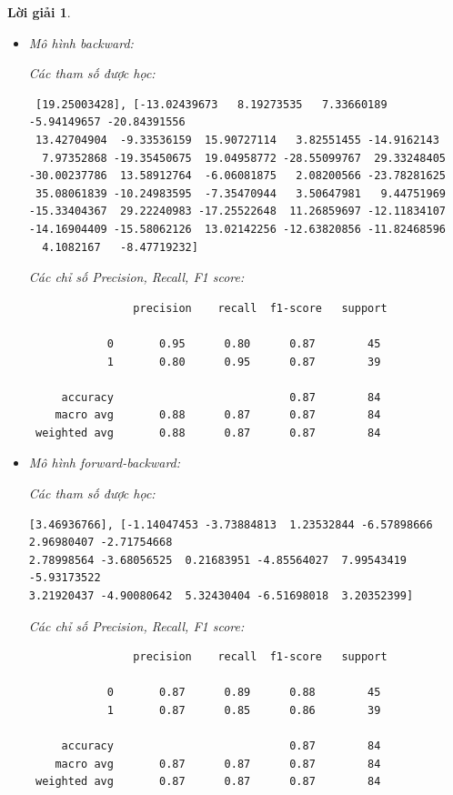 \documentclass[14pt, a4paper]{article}
\theoremstyle{sltheorem}
\theoremstyle{soltheorem}
\newtheorem*{loigiai}{Lời giải}
\begin{document}
\begin{loigiai}
\begin{itemize}
        \item Mô hình backward:
        
        Các tham số được học:

        \begin{verbatim}
 [19.25003428], [-13.02439673   8.19273535   7.33660189  -5.94149657 -20.84391556
 13.42704904  -9.33536159  15.90727114   3.82551455 -14.9162143
  7.97352868 -19.35450675  19.04958772 -28.55099767  29.33248405
-30.00237786  13.58912764  -6.06081875   2.08200566 -23.78281625
 35.08061839 -10.24983595  -7.35470944   3.50647981   9.44751969
-15.33404367  29.22240983 -17.25522648  11.26859697 -12.11834107
-14.16904409 -15.58062126  13.02142256 -12.63820856 -11.82468596
  4.1082167   -8.47719232]
        \end{verbatim}

        Các chỉ số Precision, Recall, F1 score:

        \begin{verbatim}
                precision    recall  f1-score   support

            0       0.95      0.80      0.87        45
            1       0.80      0.95      0.87        39
 
     accuracy                           0.87        84
    macro avg       0.88      0.87      0.87        84
 weighted avg       0.88      0.87      0.87        84
        \end{verbatim}

        \item Mô hình forward-backward:
        
        Các tham số được học:

        \begin{verbatim}
[3.46936766], [-1.14047453 -3.73884813  1.23532844 -6.57898666  2.96980407 -2.71754668
2.78998564 -3.68056525  0.21683951 -4.85564027  7.99543419 -5.93173522
3.21920437 -4.90080642  5.32430404 -6.51698018  3.20352399]
        \end{verbatim}

        Các chỉ số Precision, Recall, F1 score:

        \begin{verbatim}
                precision    recall  f1-score   support

            0       0.87      0.89      0.88        45
            1       0.87      0.85      0.86        39
 
     accuracy                           0.87        84
    macro avg       0.87      0.87      0.87        84
 weighted avg       0.87      0.87      0.87        84
        \end{verbatim}
    \end{itemize}


\end{loigiai}
\end{document}
